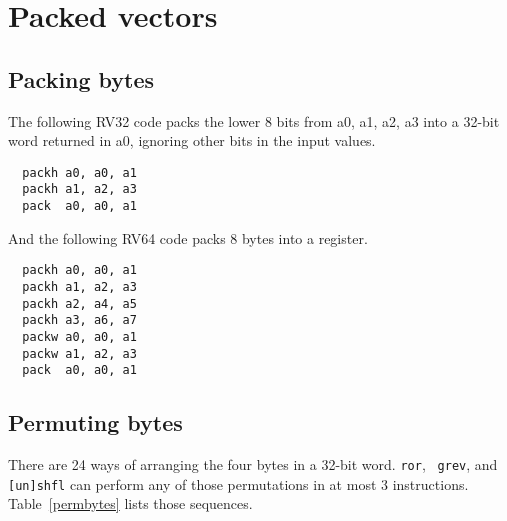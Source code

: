 
\section{Packed vectors}


\subsection{Packing bytes}

The following RV32 code packs the lower 8 bits from a0, a1, a2, a3 into
a 32-bit word returned in a0, ignoring other bits in the input values.

\begin{minipage}{\linewidth}
\begin{verbatim}
  packh a0, a0, a1
  packh a1, a2, a3
  pack  a0, a0, a1
\end{verbatim}
\end{minipage}

And the following RV64 code packs 8 bytes into a register.

\begin{minipage}{\linewidth}
\begin{verbatim}
  packh a0, a0, a1
  packh a1, a2, a3
  packh a2, a4, a5
  packh a3, a6, a7
  packw a0, a0, a1
  packw a1, a2, a3
  pack  a0, a0, a1
\end{verbatim}
\end{minipage}


\subsection{Permuting bytes}

There are 24 ways of arranging the four bytes in a 32-bit word. {\tt ror}, {\tt
grev}, and {\tt [un]shfl} can perform any of those permutations in at most 3
instructions. Table~\ref{permbytes} lists those sequences.~\cite{Wolf19A}

